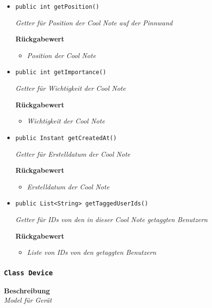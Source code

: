 \begin{itemize}
     \item{\texttt{public int getPosition()}}
     	
     	\textit{Getter für Position der Cool Note auf der Pinnwand}
     	
     	\textbf{Rückgabewert}
     	\begin{itemize}
     		\item\textit{Position der Cool Note}
     	\end{itemize}
     
     \item{\texttt{public int getImportance()}}
     	
     	\textit{Getter für Wichtigkeit der Cool Note}
     	
     	\textbf{Rückgabewert}
     	\begin{itemize}
     		\item\textit{Wichtigkeit der Cool Note}
     	\end{itemize}
     
     \item{\texttt{public Instant getCreatedAt()}}
     	
     	\textit{Getter für Erstelldatum der Cool Note}
     	
     	\textbf{Rückgabewert}
     	\begin{itemize}
     		\item\textit{Erstelldatum der Cool Note}
     	\end{itemize}
     
     \item{\texttt{public List<String> getTaggedUserIds()}}
     	
     	\textit{Getter für IDs von den in dieser Cool Note getaggten Benutzern}
     	
     	\textbf{Rückgabewert}
     	\begin{itemize}
     		\item\textit{Liste von IDs von den getaggten Benutzern}
     	\end{itemize}
     \end{itemize}
 
     \subsubsection{\texttt{Class Device}}
     \textbf{Beschreibung} \\
     \textit{Model für Gerät}
